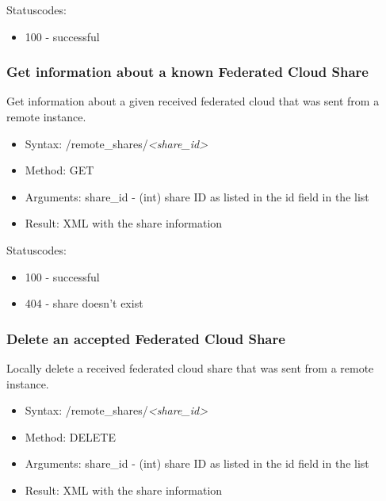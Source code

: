 \documentclass[letterpaper,10pt,english]{sphinxmanual}
\begin{document}
Statuscodes:
\begin{itemize}
\item {} 
100 - successful

\end{itemize}


\subsubsection{Get information about a known Federated Cloud Share}
\label{core/ocs-share-api:get-information-about-a-known-federated-cloud-share}
Get information about a given received federated cloud that was sent from a remote instance.
\begin{itemize}
\item {} 
Syntax: /remote\_shares/\emph{\textless{}share\_id\textgreater{}}

\item {} 
Method: GET

\item {} 
Arguments: share\_id - (int) share ID as listed in the id field in the  list

\item {} 
Result: XML with the share information

\end{itemize}

Statuscodes:
\begin{itemize}
\item {} 
100 - successful

\item {} 
404 - share doesn't exist

\end{itemize}


\subsubsection{Delete an accepted Federated Cloud Share}
\label{core/ocs-share-api:delete-an-accepted-federated-cloud-share}
Locally delete a received federated cloud share that was sent from a remote instance.
\begin{itemize}
\item {} 
Syntax: /remote\_shares/\emph{\textless{}share\_id\textgreater{}}

\item {} 
Method: DELETE

\item {} 
Arguments: share\_id - (int) share ID as listed in the id field in the  list

\item {} 
Result: XML with the share information

\end{itemize}
\end{document}
